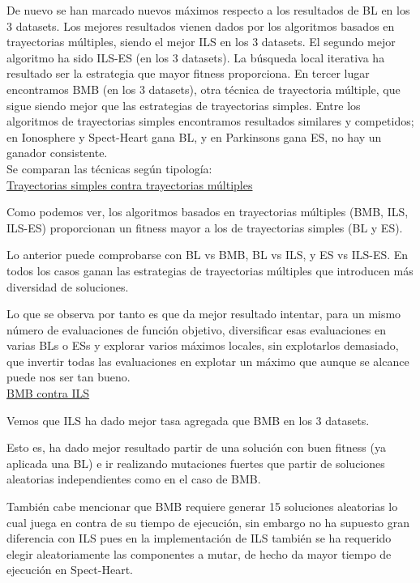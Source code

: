 \documentclass[11pt,a4paper]{article}
\theoremstyle{definition}
\begin{document}
	
	De nuevo se han marcado nuevos máximos respecto a los resultados de BL en los 3 datasets. Los mejores resultados vienen dados por los algoritmos basados en trayectorias múltiples, siendo el mejor ILS en los 3 datasets. El segundo mejor algoritmo ha sido ILS-ES (en los 3 datasets). La búsqueda local iterativa ha resultado ser la estrategia que mayor fitness proporciona. En tercer lugar encontramos BMB (en los 3 datasets), otra técnica de trayectoria múltiple, que sigue siendo mejor que las estrategias de trayectorias simples. Entre los algoritmos de trayectorias simples encontramos resultados similares y competidos; en Ionosphere y Spect-Heart gana BL, y en Parkinsons gana ES, no hay un ganador consistente.\\
	
	Se comparan las técnicas según tipología:\\
	
	
	\underline{Trayectorias simples contra trayectorias múltiples}
	
	Como podemos ver, los algoritmos basados en trayectorias múltiples (BMB, ILS, ILS-ES) proporcionan un fitness mayor a los de trayectorias simples (BL y ES).
	
	Lo anterior puede comprobarse con BL vs BMB, BL vs ILS, y ES vs ILS-ES. En todos los casos ganan las estrategias de trayectorias múltiples que introducen más diversidad de soluciones.
	
	Lo que se observa por tanto es que da mejor resultado intentar, para un mismo número de evaluaciones de función objetivo, diversificar esas evaluaciones en varias BLs o ESs y explorar varios máximos locales, sin explotarlos demasiado, que invertir todas las evaluaciones en explotar un máximo que aunque se alcance puede nos ser tan bueno.\\
	
	\underline{BMB contra ILS}
	
	Vemos que ILS ha dado mejor tasa agregada que BMB en los 3 datasets. 
	
	Esto es, ha dado mejor resultado partir de una solución con buen fitness (ya aplicada una BL) e ir realizando mutaciones fuertes que partir de soluciones aleatorias independientes como en el caso de BMB.
	
	También cabe mencionar que BMB requiere generar 15 soluciones aleatorias lo cual juega en contra de su tiempo de ejecución, sin embargo no ha supuesto gran diferencia con ILS pues en la implementación de ILS también se ha requerido elegir aleatoriamente las componentes a mutar, de hecho da mayor tiempo de ejecución en Spect-Heart.\\
	
\end{document}
